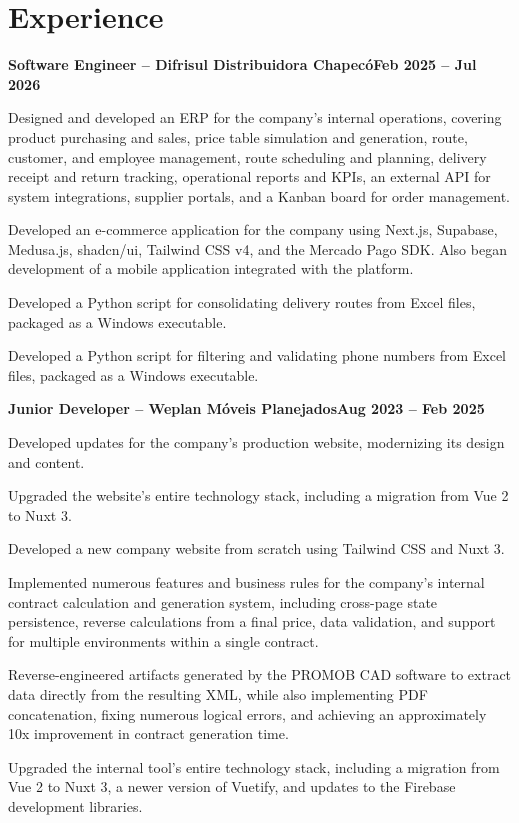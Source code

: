 \documentclass[a4paper,10pt]{article}
\newcommand{\heading}[2]{
\hspace{10pt}#1\hfill#2\\
}
\newcommand{\headingBf}[2]{
\heading{\textbf{#1}}{\textbf{#2}}
}
\newenvironment{resume_list}{
\vspace{-7pt}
\begin{itemize}[itemsep=-2px, parsep=1pt, leftmargin=30pt]
}{
\end{itemize}
}
\begin{document}
\section{Experience}

\headingBf{Software Engineer -- Difrisul Distribuidora Chapecó}{Feb 2025 -- Jul 2026}
\begin{resume_list}
\item Designed and developed an ERP for the company's internal operations, covering product purchasing and sales, price table simulation and generation, route, customer, and employee management, route scheduling and planning, delivery receipt and return tracking, operational reports and KPIs, an external API for system integrations, supplier portals, and a Kanban board for order management.
\item Developed an e-commerce application for the company using Next.js, Supabase, Medusa.js, shadcn/ui, Tailwind CSS v4, and the Mercado Pago SDK. Also began development of a mobile application integrated with the platform.
\item Developed a Python script for consolidating delivery routes from Excel files, packaged as a Windows executable.
\item Developed a Python script for filtering and validating phone numbers from Excel files, packaged as a Windows executable.
\end{resume_list}

\headingBf{Junior Developer -- Weplan Móveis Planejados}{Aug 2023 -- Feb 2025}
\begin{resume_list}
\item Developed updates for the company's production website, modernizing its design and content.
\item Upgraded the website's entire technology stack, including a migration from Vue 2 to Nuxt 3.
\item Developed a new company website from scratch using Tailwind CSS and Nuxt 3.
\item Implemented numerous features and business rules for the company's internal contract calculation and generation system, including cross-page state persistence, reverse calculations from a final price, data validation, and support for multiple environments within a single contract.
\item Reverse-engineered artifacts generated by the PROMOB CAD software to extract data directly from the resulting XML, while also implementing PDF concatenation, fixing numerous logical errors, and achieving an approximately 10x improvement in contract generation time.
\item Upgraded the internal tool's entire technology stack, including a migration from Vue 2 to Nuxt 3, a newer version of Vuetify, and updates to the Firebase development libraries.
\end{resume_list}
\end{document}
